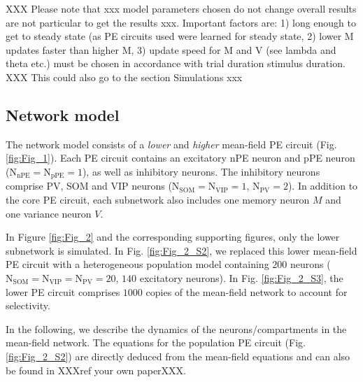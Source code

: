 \documentclass[10pt,a4paper,draft]{article}
\begin{document}
XXX Please note that xxx model parameters chosen do not change overall results are not particular to get the results xxx. Important factors are: 1) long enough to get to steady state (as PE circuits used were learned for steady state, 2) lower M updates faster than higher M, 3) update speed for M and V (see lambda and theta etc.) must be chosen in accordance with trial duration stimulus duration. XXX This could also go to the section Simulations xxx


\subsection{Network model}
%
The network model consists of a \textit{lower} and \textit{higher} mean-field PE circuit (Fig. \ref{fig:Fig_1}). Each PE circuit contains an excitatory nPE neuron and pPE neuron ($\mathrm{N}_\mathrm{nPE} = \mathrm{N}_\mathrm{pPE} = 1$), as well as inhibitory neurons. The inhibitory neurons comprise PV, SOM and VIP neurons ($\mathrm{N}_\mathrm{SOM} = \mathrm{N}_\mathrm{VIP} = 1$, $\mathrm{N}_\mathrm{PV} = 2$). In addition to the core PE circuit, each subnetwork also includes one memory neuron $M$ and one variance neuron $V$. 

In Figure \ref{fig:Fig_2} and the corresponding supporting figures, only the lower subnetwork is simulated. In Fig. \ref{fig:Fig_2_S2}, we replaced this lower mean-field PE circuit with a heterogeneous population model containing $200$ neurons ($\mathrm{N}_\mathrm{SOM} = \mathrm{N}_\mathrm{VIP} = \mathrm{N}_\mathrm{PV} = 20$, $140$ excitatory neurons). In Fig. \ref{fig:Fig_2_S3}, the lower PE circuit comprises $1000$ copies of the mean-field network to account for selectivity.

In the following, we describe the dynamics of the neurons/compartments in the mean-field network. The equations for the population PE circuit (Fig. \ref{fig:Fig_2_S2}) are directly deduced from the mean-field equations and can also be found in XXXref your own paperXXX.
\end{document}
